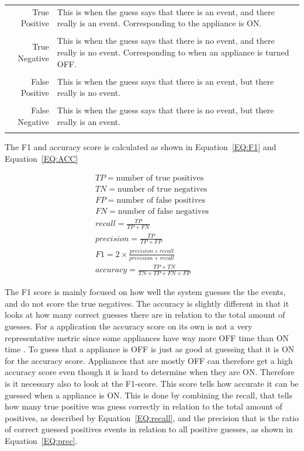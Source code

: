 \begin{tabularx}{\linewidth}{ r X }
True Positive& This is when the guess says that there is an event, and there really is an event. Corresponding to the appliance is ON. \\
\\
True Negative&This is when the guess says that there is no event, and there really is no event. Corresponding to when an appliance is turned OFF. \\
\\
False Positive& This is when the guess says that there is an event, but there really is no event. \\
\\
False Negative&This is when the guess says that there is no event, but there really is an event. \\\\
\end{tabularx}
The F1 and accuracy score is calculated as shown in Equation~\ref{EQ:F1} and Equation~\ref{EQ:ACC}

\begin{gather}
		TP = \text{number of true positives} \\
		TN = \text{number of true negatives} \\
		FP = \text{number of false positives} \\
		FN = \text{number of false negatives} \\
		recall = \frac{TP}{TP+FN} \label{EQ:recall}\\
		precision = \frac{TP}{TP+FP} \label{EQ:prec} \\
		F1 = 2 \times \frac{precision \times recall}{precision + recall} \label{EQ:F1}\\
		accuracy = \frac{TP+TN}{TN+TP+FN+FP} \label{EQ:ACC}
\end{gather}

The F1 score is mainly focused on how well the system guesses the the events, and do not score the true negatives. The accuracy is slightly different in that it looks at how many correct guesses there are in relation to the total amount of guesses. For a  application the accuracy score on its own is not a very representative metric since some appliances have way more OFF time than ON time \citep{RefWorks:35}. To guess that a appliance is OFF is just as good at guessing that it is ON for the accuracy score. Appliances that are mostly OFF can therefore get a high accuracy score even though it is hard to determine when they are ON. Therefore is it necessary also to look at the F1-score. This score tells how accurate it can be guessed when a appliance is ON. This is done by combining the recall, that tells how many true positive was guess correctly in relation to the total amount of positives, as described by Equation~\ref{EQ:recall}, and the precision that is the ratio of correct guessed positives events in relation to all positive guesses, as shown in Equation~\ref{EQ:prec}. 

